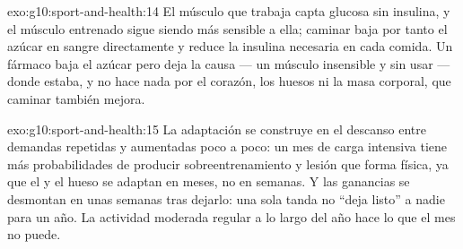 \begin{solution}{exo:g10:sport-and-health:14}
El músculo que trabaja capta glucosa sin insulina, y el músculo
entrenado sigue siendo más sensible a ella; caminar baja por tanto el
azúcar en sangre directamente y reduce la insulina necesaria en cada
comida. Un fármaco baja el azúcar pero deja la causa --- un músculo
insensible y sin usar --- donde estaba, y no hace nada por el corazón,
los huesos ni la masa corporal, que caminar también mejora.
\end{solution}

\begin{solution}{exo:g10:sport-and-health:15}
La adaptación se construye en el descanso entre demandas repetidas y
aumentadas poco a poco: un mes de carga intensiva tiene más
probabilidades de producir sobreentrenamiento y lesión que forma
física, ya que el  y el hueso se adaptan en meses, no en semanas.
Y las ganancias se desmontan en unas semanas tras dejarlo: una sola
tanda no ``deja listo'' a nadie para un año. La actividad moderada
regular a lo largo del año hace lo que el mes no puede.
\end{solution}

